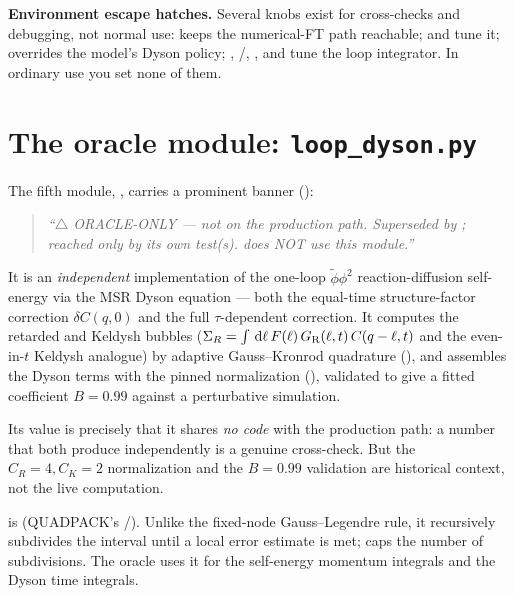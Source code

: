 \begin{note}
\textbf{Environment escape hatches.} Several knobs exist for cross-checks and
debugging, not normal use:  keeps the
numerical-FT path reachable;  and  tune
it;  overrides the model's Dyson policy;
, /,
, and  tune the loop
integrator. In ordinary use you set none of them.
\end{note}

\section{The oracle module: \texttt{loop\_dyson.py}}

The fifth module, , carries a prominent banner
():

\begin{quote}\itshape
``$\triangle$ ORACLE-ONLY --- not on the production path. Superseded by
; reached only by its own test(s).
 does NOT use this module.''
\end{quote}

It is an \emph{independent} implementation of the one-loop $\tilde\phi\phi^{2}$
reaction-diffusion  self-energy via the MSR Dyson equation --- both
the equal-time structure-factor correction $\delta C(q,0)$ and the full
$\tau$-dependent correction. It computes the retarded and Keldysh bubbles
($\Sigma_{R}=\int\,\mathrm{d}\ell\,F(\ell)\,G_{\mathrm R}(\ell,t)\,C(q-\ell,t)$ and the
even-in-$t$ Keldysh analogue) by adaptive Gauss--Kronrod quadrature
(), and assembles the Dyson terms with the pinned
normalization  (), validated
to give a fitted coefficient $B=0.99$ against a perturbative simulation.

Its value is precisely that it shares \emph{no code} with the production
 path: a number that both produce independently is a
genuine cross-check. But the $C_{R}=4,C_{K}=2$ normalization and the $B=0.99$
validation are historical context, not the live computation.

\begin{defn}
 is  (QUADPACK's /). Unlike the fixed-node
Gauss--Legendre rule, it recursively subdivides the interval until a local error
estimate is met;  caps the number of subdivisions. The oracle uses it
for the self-energy momentum integrals and the Dyson time integrals.
\end{defn}

